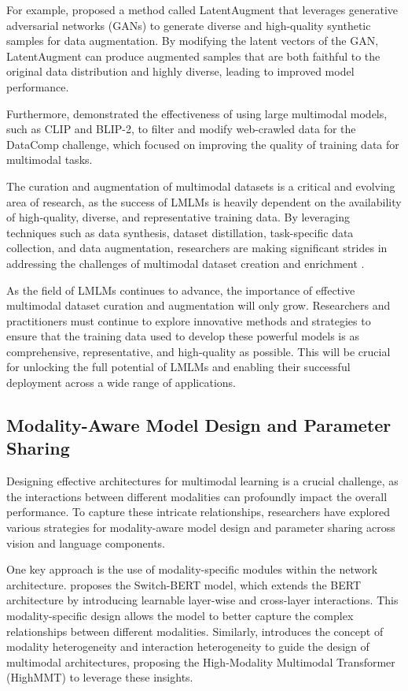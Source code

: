 \documentclass[11pt]{article}
\begin{document}
For example, \cite{ref134} proposed a method called LatentAugment that leverages generative adversarial networks (GANs) to generate diverse and high-quality synthetic samples for data augmentation. By modifying the latent vectors of the GAN, LatentAugment can produce augmented samples that are both faithful to the original data distribution and highly diverse, leading to improved model performance.

Furthermore, \cite{ref135} demonstrated the effectiveness of using large multimodal models, such as CLIP and BLIP-2, to filter and modify web-crawled data for the DataComp challenge, which focused on improving the quality of training data for multimodal tasks.

The curation and augmentation of multimodal datasets is a critical and evolving area of research, as the success of LMLMs is heavily dependent on the availability of high-quality, diverse, and representative training data. By leveraging techniques such as data synthesis, dataset distillation, task-specific data collection, and data augmentation, researchers are making significant strides in addressing the challenges of multimodal dataset creation and enrichment \cite{ref130,ref136}.

As the field of LMLMs continues to advance, the importance of effective multimodal dataset curation and augmentation will only grow. Researchers and practitioners must continue to explore innovative methods and strategies to ensure that the training data used to develop these powerful models is as comprehensive, representative, and high-quality as possible. This will be crucial for unlocking the full potential of LMLMs and enabling their successful deployment across a wide range of applications.

\subsection{Modality-Aware Model Design and Parameter Sharing}

Designing effective architectures for multimodal learning is a crucial challenge, as the interactions between different modalities can profoundly impact the overall performance. To capture these intricate relationships, researchers have explored various strategies for modality-aware model design and parameter sharing across vision and language components.

One key approach is the use of modality-specific modules within the network architecture. \cite{ref25} proposes the Switch-BERT model, which extends the BERT architecture by introducing learnable layer-wise and cross-layer interactions. This modality-specific design allows the model to better capture the complex relationships between different modalities. Similarly, \cite{ref137} introduces the concept of modality heterogeneity and interaction heterogeneity to guide the design of multimodal architectures, proposing the High-Modality Multimodal Transformer (HighMMT) to leverage these insights.
\end{document}
